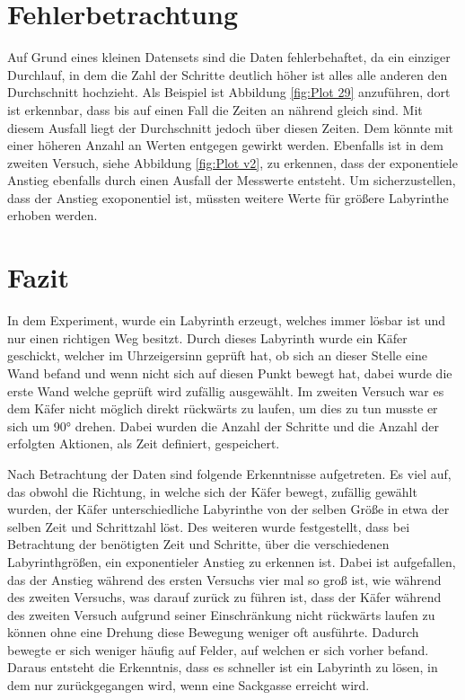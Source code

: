 \documentclass[12pt, a4paper, titlepage]{article}
\begin{document}
\section{Fehlerbetrachtung}

Auf Grund eines kleinen Datensets sind die Daten fehlerbehaftet, da ein einziger Durchlauf, in dem die Zahl der Schritte deutlich höher ist alles alle anderen den Durchschnitt hochzieht.
Als Beispiel ist Abbildung \ref{fig:Plot 29} anzuführen, dort ist erkennbar, dass bis auf einen Fall die Zeiten an nährend gleich sind.
Mit diesem Ausfall liegt der Durchschnitt jedoch über diesen Zeiten.
Dem könnte mit einer höheren Anzahl an Werten entgegen gewirkt werden.
Ebenfalls ist in dem zweiten Versuch, siehe Abbildung \ref{fig:Plot v2}, zu erkennen, dass der exponentiele Anstieg ebenfalls durch einen Ausfall der Messwerte entsteht.
Um sicherzustellen, dass der Anstieg exoponentiel ist, müssten weitere Werte für größere Labyrinthe erhoben werden.

\section{Fazit}

In dem Experiment, wurde ein Labyrinth erzeugt, welches immer lösbar ist und nur einen richtigen Weg besitzt.
Durch dieses Labyrinth wurde ein Käfer geschickt, welcher im Uhrzeigersinn geprüft hat, ob sich an dieser Stelle eine Wand befand und wenn nicht sich auf diesen Punkt bewegt hat, dabei wurde die erste Wand welche geprüft wird zufällig ausgewählt.
Im zweiten Versuch war es dem Käfer nicht möglich direkt rückwärts zu laufen, um dies zu tun musste er sich um 90° drehen.
Dabei wurden die Anzahl der Schritte und die Anzahl der erfolgten Aktionen, als Zeit definiert, gespeichert.


\bigskip

Nach Betrachtung der Daten sind folgende Erkenntnisse aufgetreten.
Es viel auf, das obwohl die Richtung, in welche sich der Käfer bewegt, zufällig gewählt wurden, der Käfer unterschiedliche Labyrinthe von der selben Größe in etwa der selben Zeit und Schrittzahl löst.
Des weiteren wurde festgestellt, dass bei Betrachtung der benötigten Zeit und Schritte, über die verschiedenen Labyrinthgrößen, ein exponentieler Anstieg zu erkennen ist.
Dabei ist aufgefallen, das der Anstieg während des ersten Versuchs vier mal so groß ist, wie während des zweiten Versuchs, was darauf zurück zu führen ist, dass der Käfer während des zweiten Versuch aufgrund seiner Einschränkung nicht rückwärts laufen zu können ohne eine Drehung diese Bewegung weniger oft ausführte.
Dadurch bewegte er sich weniger häufig auf Felder, auf welchen er sich vorher befand.
Daraus entsteht die Erkenntnis, dass es schneller ist ein Labyrinth zu lösen, in dem nur zurückgegangen wird, wenn eine Sackgasse erreicht wird.
\end{document}
